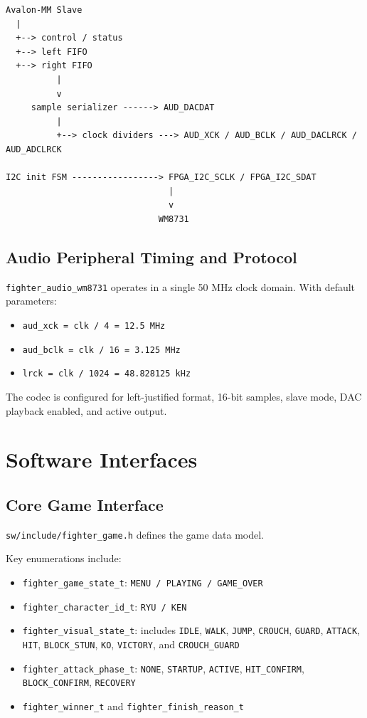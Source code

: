 \documentclass[12pt,a4paper]{article}
\begin{document}
\begin{lstlisting}[style=fighterstyle]
Avalon-MM Slave
  |
  +--> control / status
  +--> left FIFO
  +--> right FIFO
          |
          v
     sample serializer ------> AUD_DACDAT
          |
          +--> clock dividers ---> AUD_XCK / AUD_BCLK / AUD_DACLRCK / AUD_ADCLRCK

I2C init FSM -----------------> FPGA_I2C_SCLK / FPGA_I2C_SDAT
                                |
                                v
                              WM8731
\end{lstlisting}

\subsection{Audio Peripheral Timing and Protocol}

\texttt{fighter\_audio\_wm8731} operates in a single 50 MHz clock domain.
With default parameters:

\begin{itemize}
  \item \texttt{aud\_xck = clk / 4 = 12.5 MHz}
  \item \texttt{aud\_bclk = clk / 16 = 3.125 MHz}
  \item \texttt{lrck = clk / 1024 = 48.828125 kHz}
\end{itemize}

The codec is configured for left-justified format, 16-bit samples, slave mode,
DAC playback enabled, and active output.

\section{Software Interfaces}

\subsection{Core Game Interface}

\texttt{sw/include/fighter\_game.h} defines the game data model.

Key enumerations include:

\begin{itemize}
  \item \texttt{fighter\_game\_state\_t}: \texttt{MENU / PLAYING / GAME\_OVER}
  \item \texttt{fighter\_character\_id\_t}: \texttt{RYU / KEN}
  \item \texttt{fighter\_visual\_state\_t}: includes \texttt{IDLE},
  \texttt{WALK}, \texttt{JUMP}, \texttt{CROUCH}, \texttt{GUARD},
  \texttt{ATTACK}, \texttt{HIT}, \texttt{BLOCK\_STUN}, \texttt{KO},
  \texttt{VICTORY}, and \texttt{CROUCH\_GUARD}
  \item \texttt{fighter\_attack\_phase\_t}: \texttt{NONE}, \texttt{STARTUP},
  \texttt{ACTIVE}, \texttt{HIT\_CONFIRM}, \texttt{BLOCK\_CONFIRM},
  \texttt{RECOVERY}
  \item \texttt{fighter\_winner\_t} and \texttt{fighter\_finish\_reason\_t}
\end{itemize}
\end{document}
